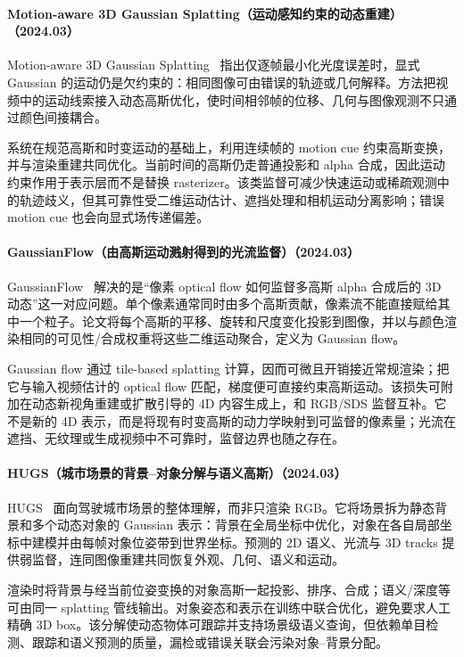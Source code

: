 \paragraph{Motion-aware 3D Gaussian Splatting（运动感知约束的动态重建）（2024.03）}
Motion-aware 3D Gaussian Splatting~\cite{2403_11447} 指出仅逐帧最小化光度误差时，显式 Gaussian 的运动仍是欠约束的：相同图像可由错误的轨迹或几何解释。方法把视频中的运动线索接入动态高斯优化，使时间相邻帧的位移、几何与图像观测不只通过颜色间接耦合。

系统在规范高斯和时变运动的基础上，利用连续帧的 motion cue 约束高斯变换，并与渲染重建共同优化。当前时间的高斯仍走普通投影和 alpha 合成，因此运动约束作用于表示层而不是替换 rasterizer。该类监督可减少快速运动或稀疏观测中的轨迹歧义，但其可靠性受二维运动估计、遮挡处理和相机运动分离影响；错误 motion cue 也会向显式场传递偏差。

\paragraph{GaussianFlow（由高斯运动溅射得到的光流监督）（2024.03）}
GaussianFlow~\cite{2403_12365} 解决的是“像素 optical flow 如何监督多高斯 alpha 合成后的 3D 动态”这一对应问题。单个像素通常同时由多个高斯贡献，像素流不能直接赋给其中一个粒子。论文将每个高斯的平移、旋转和尺度变化投影到图像，并以与颜色渲染相同的可见性/合成权重将这些二维运动聚合，定义为 Gaussian flow。

Gaussian flow 通过 tile-based splatting 计算，因而可微且开销接近常规渲染；把它与输入视频估计的 optical flow 匹配，梯度便可直接约束高斯运动。该损失可附加在动态新视角重建或扩散引导的 4D 内容生成上，和 RGB/SDS 监督互补。它不是新的 4D 表示，而是将现有时变高斯的动力学映射到可监督的像素量；光流在遮挡、无纹理或生成视频中不可靠时，监督边界也随之存在。

\paragraph{HUGS（城市场景的背景--对象分解与语义高斯）（2024.03）}
HUGS~\cite{2403_12722} 面向驾驶城市场景的整体理解，而非只渲染 RGB。它将场景拆为静态背景和多个动态对象的 Gaussian 表示：背景在全局坐标中优化，对象在各自局部坐标中建模并由每帧对象位姿带到世界坐标。预测的 2D 语义、光流与 3D tracks 提供弱监督，连同图像重建共同恢复外观、几何、语义和运动。

渲染时将背景与经当前位姿变换的对象高斯一起投影、排序、合成；语义/深度等可由同一 splatting 管线输出。对象姿态和表示在训练中联合优化，避免要求人工精确 3D box。该分解使动态物体可跟踪并支持场景级语义查询，但依赖单目检测、跟踪和语义预测的质量，漏检或错误关联会污染对象--背景分配。

